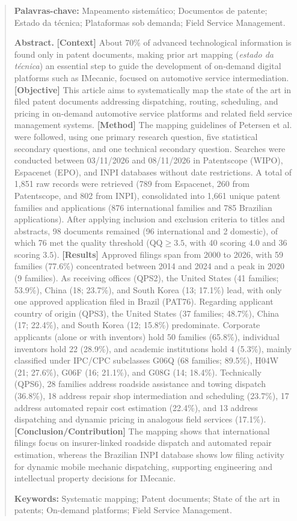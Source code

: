 \documentclass[12pt,a4paper]{article}
\begin{document}
\begin{abstract}
\medskip
\noindent\textbf{Palavras-chave:} Mapeamento sistemático; Documentos de patente; Estado da técnica; Plataformas sob demanda; Field Service Management.

\bigskip
\noindent\textbf{Abstract.}
\textbf{[Context]} About 70\% of advanced technological information is found only in patent documents, making prior art mapping (\textit{estado da técnica}) an essential step to guide the development of on-demand digital platforms such as IMecanic, focused on automotive service intermediation.
\textbf{[Objective]} This article aims to systematically map the state of the art in filed patent documents addressing dispatching, routing, scheduling, and pricing in on-demand automotive service platforms and related field service management systems.
\textbf{[Method]} The mapping guidelines of Petersen et al. were followed, using one primary research question, five statistical secondary questions, and one technical secondary question. Searches were conducted between 03/11/2026 and 08/11/2026 in Patentscope (WIPO), Espacenet (EPO), and INPI databases without date restrictions. A total of 1,851 raw records were retrieved (789 from Espacenet, 260 from Patentscope, and 802 from INPI), consolidated into 1,661 unique patent families and applications (876 international families and 785 Brazilian applications). After applying inclusion and exclusion criteria to titles and abstracts, 98 documents remained (96 international and 2 domestic), of which 76 met the quality threshold ($\text{QQ} \ge 3.5$, with 40 scoring $4.0$ and 36 scoring $3.5$).
\textbf{[Results]} Approved filings span from 2000 to 2026, with 59 families (77.6\%) concentrated between 2014 and 2024 and a peak in 2020 (9 families). As receiving offices (QPS2), the United States (41 families; 53.9\%), China (18; 23.7\%), and South Korea (13; 17.1\%) lead, with only one approved application filed in Brazil (PAT76). Regarding applicant country of origin (QPS3), the United States (37 families; 48.7\%), China (17; 22.4\%), and South Korea (12; 15.8\%) predominate. Corporate applicants (alone or with inventors) hold 50 families (65.8\%), individual inventors hold 22 (28.9\%), and academic institutions hold 4 (5.3\%), mainly classified under IPC/CPC subclasses G06Q (68 families; 89.5\%), H04W (21; 27.6\%), G06F (16; 21.1\%), and G08G (14; 18.4\%). Technically (QPS6), 28 families address roadside assistance and towing dispatch (36.8\%), 18 address repair shop intermediation and scheduling (23.7\%), 17 address automated repair cost estimation (22.4\%), and 13 address dispatching and dynamic pricing in analogous field services (17.1\%).
\textbf{[Conclusion/Contribution]} The mapping shows that international filings focus on insurer-linked roadside dispatch and automated repair estimation, whereas the Brazilian INPI database shows low filing activity for dynamic mobile mechanic dispatching, supporting engineering and intellectual property decisions for IMecanic.

\medskip
\noindent\textbf{Keywords:} Systematic mapping; Patent documents; State of the art in patents; On-demand platforms; Field Service Management.
\end{abstract}
\end{document}
